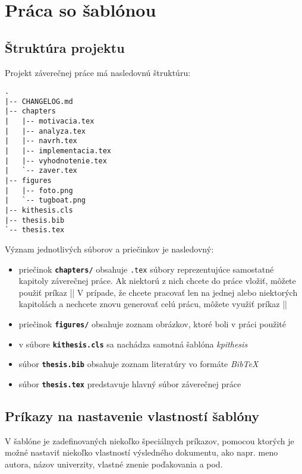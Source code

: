 \chapter{Práca so šablónou}

\section{Štruktúra projektu}

Projekt záverečnej práce má nasledovnú štruktúru:

\begin{verbatim}
.
|-- CHANGELOG.md
|-- chapters
|   |-- motivacia.tex
|   |-- analyza.tex
|   |-- navrh.tex
|   |-- implementacia.tex
|   |-- vyhodnotenie.tex
|   `-- zaver.tex
|-- figures
|   |-- foto.png
|   `-- tugboat.png
|-- kithesis.cls
|-- thesis.bib
`-- thesis.tex
\end{verbatim}

Význam jednotlivých súborov a priečinkov je nasledovný:

\begin{itemize}
    \item priečinok {\tt \bf{chapters/}} obsahuje {\tt .tex} súbory reprezentujúce samostatné kapitoly záverečnej práce. Ak niektorú z nich chcete do práce vložiť, môžete použiť príkaz || V prípade, že chcete pracovať len na jednej alebo niektorých kapitolách a nechcete znovu generovať celú prácu, môžete využiť príkaz ||
    \item priečinok {\tt \bf{figures/}} obsahuje zoznam obrázkov, ktoré boli v práci použité
    \item v súbore {\tt \bf{kithesis.cls}} sa nachádza samotná šablóna \emph{kpithesis}
    \item súbor {\tt \bf{thesis.bib}} obsahuje zoznam literatúry vo formáte \emph{BibTeX}
    \item súbor {\tt \bf{thesis.tex}} predstavuje hlavný súbor záverečnej práce
\end{itemize}


\section{Príkazy na nastavenie vlastností šablóny}

V šablóne je zadefinovaných niekoľko špeciálnych príkazov, pomocou ktorých je možné nastaviť niekoľko vlastností výsledného dokumentu, ako napr. meno autora, názov univerzity, vlastné znenie poďakovania a pod.

